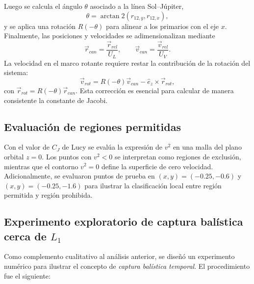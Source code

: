 \documentclass[12pt,a4paper]{article}
\begin{document}
Luego se calcula el ángulo \(\theta\) asociado a la línea Sol--Júpiter,
\begin{equation}
\theta=\arctan2(r_{12,y},r_{12,x}),
\end{equation}
y se aplica una rotación \(R(-\theta)\) para alinear a los primarios con el eje \(x\). Finalmente, las posiciones y velocidades se adimensionalizan mediante
\begin{equation}
\vec r_{can}=\frac{\vec r_{rel}}{U_L},\qquad \vec v_{can}=\frac{\vec v_{rel}}{U_V}.
\end{equation}
La velocidad en el marco rotante requiere restar la contribución de la rotación del sistema:
\begin{equation}
\vec v_{rot}=R(-\theta)\vec v_{can}-\hat e_z\times\vec r_{rot},
\end{equation}
con \(\vec r_{rot}=R(-\theta)\vec r_{can}\). Esta corrección es esencial para calcular de manera consistente la constante de Jacobi.

\subsection{Evaluación de regiones permitidas}
Con el valor de \(C_J\) de Lucy se evalúa la expresión de \(v^2\) en una malla del plano orbital \(z=0\). Los puntos con \(v^2<0\) se interpretan como regiones de exclusión, mientras que el contorno \(v^2=0\) define la superficie de cero velocidad. Adicionalmente, se evaluaron puntos de prueba en \((x,y)=(-0.25,-0.6)\) y \((x,y)=(-0.25,-1.6)\) para ilustrar la clasificación local entre región permitida y región prohibida.

\subsection{Experimento exploratorio de captura balística cerca de \texorpdfstring{\(L_1\)}{L1}}
\label{sec:metodologia_captura}
Como complemento cualitativo al análisis anterior, se diseñó un experimento numérico para ilustrar el concepto de \emph{captura balística temporal}. El procedimiento fue el siguiente:
\end{document}

